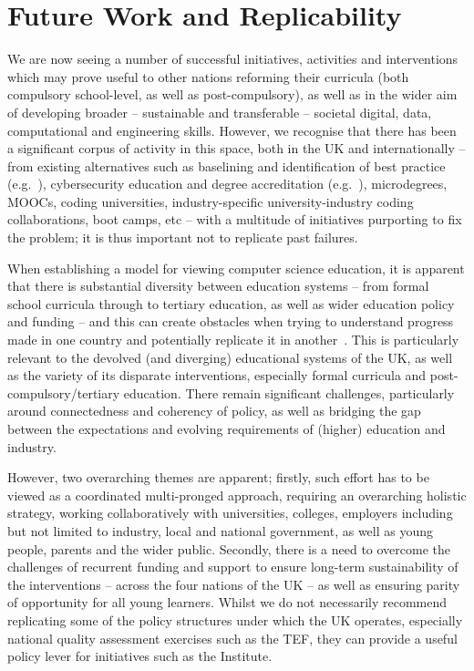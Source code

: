 \documentclass[conference]{IEEEtran}
\begin{document}
\section{Future Work and Replicability}\label{concl}

We are now seeing a number of successful initiatives, activities and
interventions which may prove useful to other nations reforming their
curricula (both compulsory school-level, as well as post-compulsory),
as well as in the wider aim of developing broader -- sustainable and
transferable -- societal digital, data, computational and engineering
skills. However, we recognise that there has been a significant corpus
of activity in this space, both in the UK and internationally -- from
existing alternatives such as baselining and identification of best
practice (e.g.~\cite{murphy-et-al:programming2017}), cybersecurity
education and degree accreditation (e.g.~\cite{crick-et-al:fie2019, itnowcyber:2019}),
microdegrees, MOOCs, coding universities, industry-specific
university-industry coding collaborations, boot camps, etc -- with a
multitude of initiatives purporting to fix the problem; it is thus
important not to replicate past failures.

When establishing a model for viewing computer science education, it
is apparent that there is substantial diversity between education
systems -- from formal school curricula through to tertiary education,
as well as wider education policy and funding -- and this can create
obstacles when trying to understand progress made in one country and
potentially replicate it in another~\cite{hubwieser:2013}. This is
particularly relevant to the devolved (and diverging) educational
systems of the UK, as well as the variety of its disparate
interventions, especially formal curricula and
post-compulsory/tertiary education.  There remain significant
challenges, particularly around connectedness and coherency of policy,
as well as bridging the gap between the expectations and evolving
requirements of (higher) education and industry.

However, two overarching themes are apparent; firstly, such effort has
to be viewed as a coordinated multi-pronged approach, requiring an
overarching holistic strategy, working collaboratively with
universities, colleges, employers including but not limited to
industry, local and national government, as well as young people,
parents and the wider public. Secondly, there is a need to overcome
the challenges of recurrent funding and support to ensure long-term
sustainability of the interventions -- across the four nations of the
UK -- as well as ensuring parity of opportunity for all young
learners. Whilst we do not necessarily recommend replicating some of
the policy structures under which the UK operates, especially national
quality assessment exercises such as the TEF, they can provide a
useful policy lever for initiatives such as the Institute.
\end{document}
